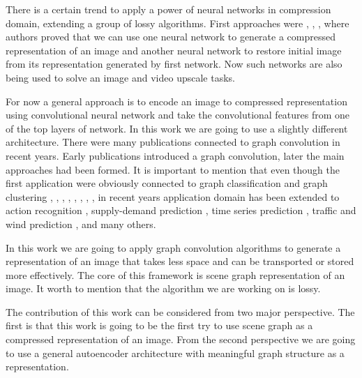 There is a certain trend to apply a power of neural networks in compression domain, extending a group of lossy algorithms. First approaches were \cite{Balle_Laparra_Simoncelli_2017}, \cite{Theis_Shi_Cunningham_Huszar_2017}, \cite{Toderici_Vincent_Johnston_Hwang_Minnen_Shor_Covell_2017}, where authors proved that we can use one neural network to generate a compressed representation of an image and another neural network to restore initial image from its representation generated by first network. Now such networks are also being used to solve an image and video upscale tasks.

For now a general approach is to encode an image to compressed representation using convolutional neural network and take the convolutional features from one of the top layers of network. In this work we are going to use a slightly different architecture. There were many publications connected to graph convolution in recent years. Early publications introduced a graph convolution, later the main approaches had been formed. It is important to mention that even though the first application were obviously connected to graph classification and graph clustering \cite{Kipf_Welling_2017}, \cite{Defferrard_Bresson_Vandergheynst_2017}, \cite{Fey_Lenssen_Weichert_Muller_2018}, \cite{Hamilton_Ying_Leskovec_2017}, \cite{Hamilton_Ying_Leskovec_2018}, \cite{Monti_Boscaini_Masci_Rodolà_Svoboda_Bronstein_2017}, \cite{Monti_Otness_Bronstein_2018}, \cite{Velicković_Cucurull_Casanova_Romero_Liò_Bengio_2017}, in recent years application domain has been extended to action recognition \cite{Cheng_Zhang_He_Chen_Cheng_Lu_2020}, supply-demand prediction \cite{Jin_Xia_Liu_Murata_Kim_2021}, time series prediction \cite{Cheng_Zhang_He_Chen_Cheng_Lu_2020}, traffic and wind prediction \cite{Cui_Henrickson_Ke_Wang_2020}, \cite{Stańczyk_Mehrkanoon_2021} and many others.

In this work we are going to apply graph convolution algorithms to generate a representation of an image that takes less space and can be transported or stored more effectively. The core of this framework is scene graph representation of an image. It worth to mention that the algorithm we are working on is lossy.

The contribution of this work can be considered from two major perspective. The first is that this work is going to be the first try to use scene graph as a compressed representation of an image. From the second perspective we are going to use a general autoencoder architecture with meaningful graph structure as a representation.


